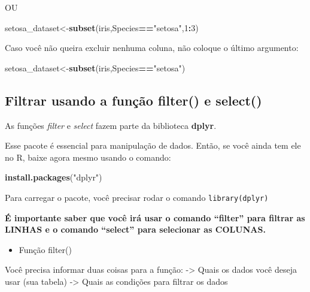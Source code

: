 \documentclass[
]{book}
\newenvironment{Shaded}{\begin{snugshade}}{\end{snugshade}}
\newcommand{\DecValTok}[1]{\textcolor[rgb]{0.00,0.00,0.81}{#1}}
\newcommand{\KeywordTok}[1]{\textcolor[rgb]{0.13,0.29,0.53}{\textbf{#1}}}
\newcommand{\NormalTok}[1]{#1}
\newcommand{\OperatorTok}[1]{\textcolor[rgb]{0.81,0.36,0.00}{\textbf{#1}}}
\newcommand{\StringTok}[1]{\textcolor[rgb]{0.31,0.60,0.02}{#1}}
\providecommand{\tightlist}{%
  \setlength{\itemsep}{0pt}\setlength{\parskip}{0pt}}
\begin{document}
OU

\begin{Shaded}
\begin{Highlighting}[]
\NormalTok{setosa_dataset<-}\KeywordTok{subset}\NormalTok{(iris,Species}\OperatorTok{==}\StringTok{"setosa"}\NormalTok{,}\DecValTok{1}\OperatorTok{:}\DecValTok{3}\NormalTok{)}
\end{Highlighting}
\end{Shaded}

Caso você não queira excluir nenhuma coluna, não coloque o último
argumento:

\begin{Shaded}
\begin{Highlighting}[]
\NormalTok{setosa_dataset<-}\KeywordTok{subset}\NormalTok{(iris,Species}\OperatorTok{==}\StringTok{"setosa"}\NormalTok{)}
\end{Highlighting}
\end{Shaded}

\hypertarget{filtrar-usando-a-funuxe7uxe3o-filter-e-select}{%
\subsection{Filtrar usando a função filter() e
select()}\label{filtrar-usando-a-funuxe7uxe3o-filter-e-select}}

As funções \emph{filter} e \emph{select} fazem parte da biblioteca
\textbf{dplyr}.

Esse pacote é essencial para manipulação de dados. Então, se você ainda
tem ele no R, baixe agora mesmo usando o comando:

\begin{Shaded}
\begin{Highlighting}[]
\KeywordTok{install.packages}\NormalTok{(}\StringTok{"dplyr"}\NormalTok{)}
\end{Highlighting}
\end{Shaded}

Para carregar o pacote, você precisar rodar o comando
\texttt{library(dplyr)}

\textbf{É importante saber que você irá usar o comando ``filter'' para
filtrar as LINHAS e o comando ``select'' para selecionar as COLUNAS.}

\begin{itemize}
\tightlist
\item
  Função filter()
\end{itemize}

Você precisa informar duas coisas para a função: -\textgreater{} Quais
os dados você deseja usar (sua tabela) -\textgreater{} Quais as
condições para filtrar os dados
\end{document}
